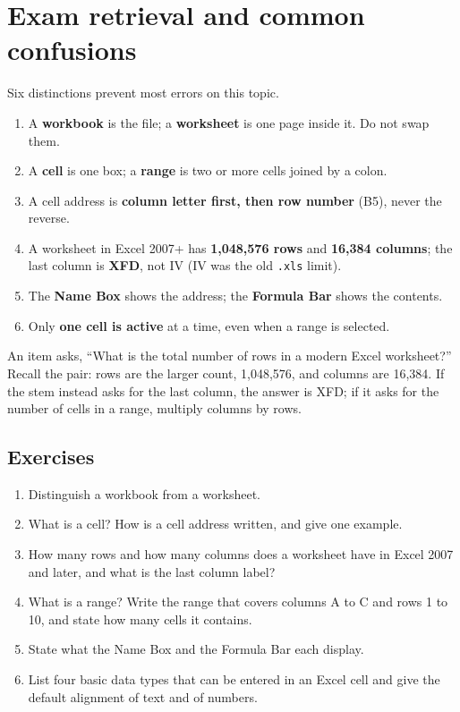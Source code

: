 \section{Exam retrieval and common confusions}
Six distinctions prevent most errors on this topic.
\begin{enumerate}
  \item A \textbf{workbook} is the file; a \textbf{worksheet} is one page
    inside it. Do not swap them.
  \item A \textbf{cell} is one box; a \textbf{range} is two or more cells
    joined by a colon.
  \item A cell address is \textbf{column letter first, then row number}
    (B5), never the reverse.
  \item A worksheet in Excel 2007+ has \textbf{1,048,576 rows} and
    \textbf{16,384 columns}; the last column is \textbf{XFD}, not IV (IV was
    the old \texttt{.xls} limit).
  \item The \textbf{Name Box} shows the address; the \textbf{Formula Bar}
    shows the contents.
  \item Only \textbf{one cell is active} at a time, even when a range is
    selected.
\end{enumerate}

\begin{example}
An item asks, ``What is the total number of rows in a modern Excel
worksheet?'' Recall the pair: rows are the larger count, 1,048,576, and
columns are 16,384. If the stem instead asks for the last column, the answer
is XFD; if it asks for the number of cells in a range, multiply columns by
rows.
\end{example}

\subsection*{Exercises}
\begin{enumerate}[label=\arabic*.]
  \item Distinguish a workbook from a worksheet.
  \item What is a cell? How is a cell address written, and give one example.
  \item How many rows and how many columns does a worksheet have in Excel
    2007 and later, and what is the last column label?
  \item What is a range? Write the range that covers columns A to C and rows
    1 to 10, and state how many cells it contains.
  \item State what the Name Box and the Formula Bar each display.
  \item List four basic data types that can be entered in an Excel cell and
    give the default alignment of text and of numbers.
\end{enumerate}

